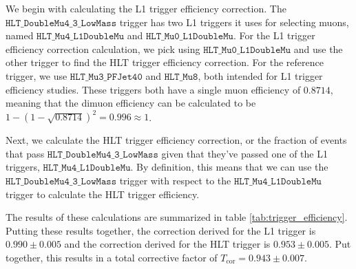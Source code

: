 We begin with calculating the L1 trigger efficiency correction. The $\texttt{HLT\_DoubleMu4\_3\_LowMass}$ trigger has two L1 triggers it uses for selecting muons, named $\texttt{HLT\_Mu4\_L1DoubleMu}$ and $\texttt{HLT\_Mu0\_L1DoubleMu}$. For the L1 trigger efficiency correction calculation, we pick using $\texttt{HLT\_Mu0\_L1DoubleMu}$ and use the other trigger to find the HLT trigger efficiency correction. For the reference trigger, we use $\texttt{HLT\_Mu3\_PFJet40}$ and $\texttt{HLT\_Mu8}$, both intended for L1 trigger efficiency studies. These triggers both have a single muon efficiency of $0.8714$, meaning that the dimuon efficiency can be calculated to be $1- (1-\sqrt{0.8714})^2 = 0.996 \approx 1$. 

Next, we calculate the HLT trigger efficiency correction, or the fraction of events that pass $\texttt{HLT\_DoubleMu4\_3\_LowMass}$ given that they've passed one of the L1 triggers, $\texttt{HLT\_Mu4\_L1DoubleMu}$. By definition, this means that we can use the $\texttt{HLT\_DoubleMu4\_3\_LowMass}$ trigger with respect to the  $\texttt{HLT\_Mu4\_L1DoubleMu}$ trigger to calculate the HLT trigger efficiency. 

The results of these calculations are summarized in table \ref{tab:trigger_efficiency}. Putting these results together, the correction derived for the L1 trigger is $0.990 \pm 0.005$ and the correction derived for the HLT trigger is $0.953 \pm 0.005$. Put together, this results in a total corrective factor of $T_{\text{cor}} = 0.943 \pm 0.007$. 

